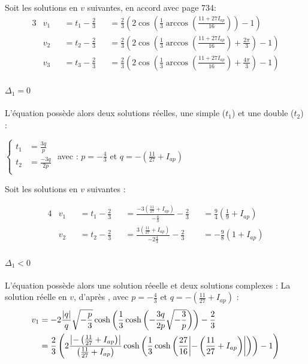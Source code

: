 \documentclass[12pt,a4paper,onecolumn]{article}
\begin{document}
Soit les solutions en $v$ suivantes, en accord avec \cite{zwillinger2011crc} page 734:
\begin{alignat}{3}
&v_1 &&= t_1 - \frac{2}{3} &&= \displaystyle{\frac{2}{3}\left(2\cos\left(\frac{1}{3}\arccos\left(\frac{11 + 27I_{ap}}{16}\right)\right) - 1\right)} \label{Branche1}\\
&v_2 &&= t_2 - \frac{2}{3} &&= \displaystyle{\frac{2}{3}\left(2\cos\left(\frac{1}{3}\arccos\left(\frac{11 + 27I_{ap}}{16}\right) + \frac{2\pi}{3}\right) - 1\right)} \label{Branche2}\\
&v_3 &&= t_3 - \frac{2}{3} &&= \displaystyle{\frac{2}{3}\left(2\cos\left(\frac{1}{3}\arccos\left(\frac{11 + 27I_{ap}}{16}\right) + \frac{4\pi}{3}\right) - 1\right)} \label{Branche3}
\end{alignat}

\paragraph{$\Delta_1 = 0$} L'équation possède alors deux solutions réelles, une simple ($t_1$) et une double ($t_2$) :

$\left\{
\begin{array}{rl}
t_1 &= \displaystyle{\frac{3q}{p}}\\
t_2 &= \displaystyle{\frac{-3q}{2p}}\\
\end{array}
\right.$
avec :
$p = -\displaystyle{\frac{4}{3}}$ et $q = -\displaystyle{\left(\frac{11}{27} + I_{ap}\right)}$

Soit les solutions en $v$ suivantes :

\begin{alignat}{4}
&v_1 &&= t_1 - \frac{2}{3} &&= \displaystyle{\frac{-3(\frac{11}{27} + I_{ap})}{-\frac{4}{3}} - \frac{2}{3}} &&= \frac{9}{4}\left(\frac{1}{9} + I_{ap}\right) \\
&v_2 &&= t_2 - \frac{2}{3} &&= \displaystyle{\frac{3(\frac{11}{27} + I_{ap})}{-2\frac{4}{3}} - \frac{2}{3}} &&= -\frac{9}{8}\left(1 + I_{ap}\right)
\end{alignat}

\paragraph{$\Delta_1 < 0$} L'équation possède alors une solution réeelle et deux solutions complexes :
La solution réelle en $v$, d'après \cite{holmes200286}, avec $p = -\displaystyle{\frac{4}{3}}$ et $q = -\displaystyle{\left(\frac{11}{27} + I_{ap}\right)}$ :
\begin{align}
v_1 &= \displaystyle{-2\frac{\abs{q}}{q}\sqrt{-\frac{p}{3}}\cosh\left(\frac{1}{3}\cosh\left(-\frac{3q}{2p}\sqrt{-\frac{3}{p}}\right)\right)-\frac{2}{3}} \nonumber\\
&= \displaystyle{\frac{2}{3}\left(2\frac{\abs{-\left(\frac{11}{27} + I_{ap}\right)}}{\left(\frac{11}{27} + I_{ap}\right)}\cosh\left(\frac{1}{3}\cosh\left(\frac{27}{16}\abs{-\left(\frac{11}{27} + I_{ap}\right)}\right)\right) - 1\right)} \label{BrancheSolo}
\end{align}
\end{document}
